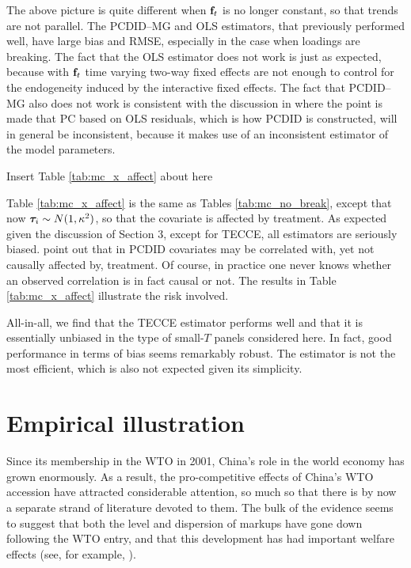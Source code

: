 \documentclass[12pt,fleqn]{article}
\begin{document}
  The above picture is quite different when $\mathbf{f}_{t}$ is no longer constant, so that trends are not parallel. The PCDID--MG and OLS estimators, that previously performed well, have large bias and RMSE, especially in the case when loadings are breaking. The fact that the OLS estimator does not work is just as expected, because with $\mathbf{f}_{t}$ time varying two-way fixed effects are not enough to control for the endogeneity induced by the interactive fixed effects. The fact that PCDID--MG also does not work is consistent with the discussion in \citet{pesaran2006estimation} where the point is made that PC based on OLS residuals, which is how PCDID is constructed, will in general be inconsistent, because it makes use of an inconsistent estimator of the model parameters.
  
  \begin{center}
  {\sc Insert Table \ref{tab:mc_x_affect} about here}
  \end{center}
  
  Table \ref{tab:mc_x_affect} is the same as Tables \ref{tab:mc_no_break}, except that now $\boldsymbol{\tau}_{i} \sim N(1,\kappa^2)$, so that the covariate is affected by treatment. As expected given the discussion of Section 3, except for TECCE, all estimators are seriously biased. \citet{chan2022pcdid} point out that in PCDID covariates may be correlated with, yet not causally affected by, treatment. Of course, in practice one never knows whether an observed correlation is in fact causal or not. The results in Table \ref{tab:mc_x_affect} illustrate the risk involved.
  
  All-in-all, we find that the TECCE estimator performs well and that it is essentially unbiased in the type of small-$T$ panels considered here. In fact, good performance in terms of bias seems remarkably robust. The estimator is not the most efficient, which is also not expected given its simplicity.
  
  \section{Empirical illustration}
  
  Since its membership in the WTO in 2001, China's role in the world economy has grown enormously. As a result, the pro-competitive effects of China's WTO accession have attracted considerable attention, so much so that there is by now a separate strand of literature devoted to them. The bulk of the evidence seems to suggest that both the level and dispersion of markups have gone down following the WTO entry, and that this development has had important welfare effects (see, for example, \citealp{Hsu_etal_2020}).
  
\end{document}

